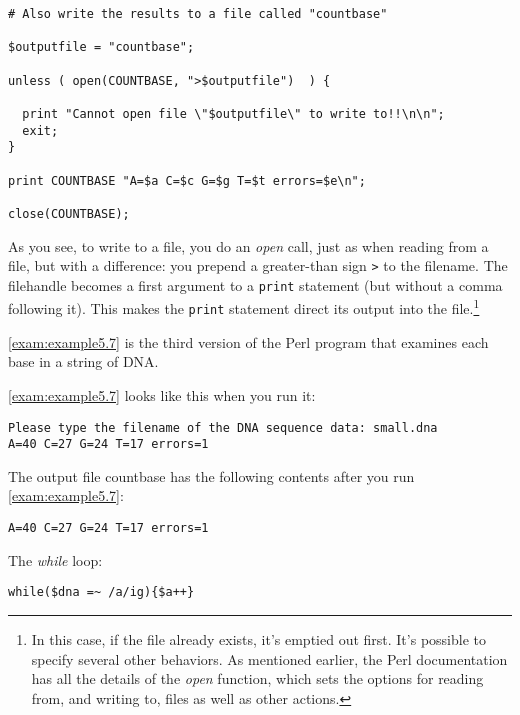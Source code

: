 \begin{lstlisting}
# Also write the results to a file called "countbase"

$outputfile = "countbase";

unless ( open(COUNTBASE, ">$outputfile")  ) {

  print "Cannot open file \"$outputfile\" to write to!!\n\n";
  exit;
}

print COUNTBASE "A=$a C=$c G=$g T=$t errors=$e\n";

close(COUNTBASE);
\end{lstlisting}

As you see, to write to a file, you do an \textit{open} call, just as when reading from a file, but with a difference: you prepend a greater-than sign \verb|>| to the filename. The filehandle becomes a first argument to a \verb|print| statement (but without a comma following it). This makes the \verb|print| statement direct its output into the file.\footnote{In this case, if the file already exists, it's emptied out first. It's possible to specify several other behaviors. As mentioned earlier, the Perl documentation has all the details of the \textit{open} function, which sets the options for reading from, and writing to, files as well as other actions.}

\autoref{exam:example5.7} is the third version of the Perl program that examines each base in a string of DNA. 



\autoref{exam:example5.7} looks like this when you run it:

\begin{lstlisting}
Please type the filename of the DNA sequence data: small.dna
A=40 C=27 G=24 T=17 errors=1
\end{lstlisting}

The output file countbase has the following contents after you run \autoref{exam:example5.7}:

\begin{lstlisting}
A=40 C=27 G=24 T=17 errors=1
\end{lstlisting}

The \textit{while} loop:

\begin{lstlisting}
while($dna =~ /a/ig){$a++} 
\end{lstlisting}

